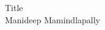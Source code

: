 \documentclass[11pt, a4paper]{article}
\begin{document}
\onehalfspacing


\begin{center}
{\LARGE Title}\\
{Manideep Mamindlapally}\\
\end{center}
\vspace{1em}




\pagebreak
% 
% 
\end{document}
